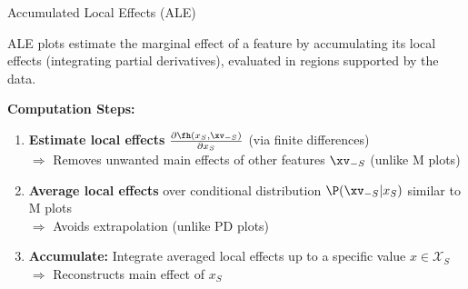 \documentclass[10pt,compress,t,notes=noshow, xcolor=table]{beamer}
\begin{document}
\begin{frame}{Accumulated Local Effects (ALE) }

ALE plots estimate the marginal effect of a feature by accumulating its local effects (integrating partial derivatives), evaluated in regions supported by the data. 



\medskip
\textbf{Computation Steps:}
\begin{enumerate}[<+->]
\item \textbf{Estimate local effects} $\frac{\partial \fh(x_S, \xv_{-S})}{\partial x_S}$ (via finite differences) \label{ref1}\\ %
$\Rightarrow$ Removes unwanted main effects of other features $\xv_{-S}$ (unlike M plots)
\item \textbf{Average local effects} over conditional distribution $\P(\xv_{-S}|x_S)$ similar to M plots\\ %
$\Rightarrow$ Avoids extrapolation (unlike PD plots)\label{ref2}
\item \textbf{Accumulate:} Integrate averaged local effects up to a specific value $x \in \mathcal{X}_S$\\ %
$\Rightarrow$ Reconstructs main effect of $x_S$ \label{ref3}\\
\end{enumerate}

\end{frame}
\end{document}
